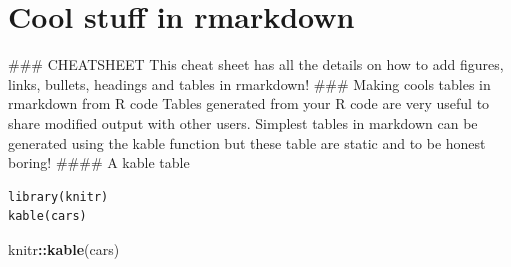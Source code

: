 \documentclass[
]{book}
\newenvironment{Shaded}{\begin{snugshade}}{\end{snugshade}}
\newcommand{\KeywordTok}[1]{\textcolor[rgb]{0.13,0.29,0.53}{\textbf{#1}}}
\newcommand{\NormalTok}[1]{#1}
\newcommand{\OperatorTok}[1]{\textcolor[rgb]{0.81,0.36,0.00}{\textbf{#1}}}
\begin{document}
\hypertarget{cool-stuff-in-rmarkdown}{%
\section{Cool stuff in rmarkdown}\label{cool-stuff-in-rmarkdown}}

\#\#\# CHEATSHEET
This cheat sheet has all the details on how to add figures, links, bullets, headings and tables in rmarkdown!
\href{img/rmarkdown-2.0.pdf}{}
\#\#\# Making cools tables in rmarkdown from R code
Tables generated from your R code are very useful to share modified output with other users.
Simplest tables in markdown can be generated using the kable function but these table are static and to be honest boring!
\#\#\#\# A kable table

\begin{verbatim}
library(knitr)
kable(cars)
\end{verbatim}

\begin{Shaded}
\begin{Highlighting}[]
\NormalTok{knitr}\OperatorTok{::}\KeywordTok{kable}\NormalTok{(cars)}
\end{Highlighting}
\end{Shaded}
\end{document}
